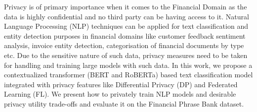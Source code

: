 Privacy is of primary importance when it comes to the Financial Domain as the data is highly confidential and no third party can be having access to it. Natural Language Processing (NLP) techniques can be applied for text classification and entity detection  purposes in financial domains like customer feedback sentiment analysis, invoice entity detection, categorisation of financial documents by type etc. Due to the sensitive nature of such data, privacy measures need to be taken for handling and training large models with such data. In this work, we propose a contextualized transformer (BERT and RoBERTa) based text classification model integrated with privacy features like Differential Privacy (DP) and Federated Learning (FL). We present how to privately train NLP models and desirable privacy utility trade-offs and evaluate it on the Financial Phrase Bank dataset.
